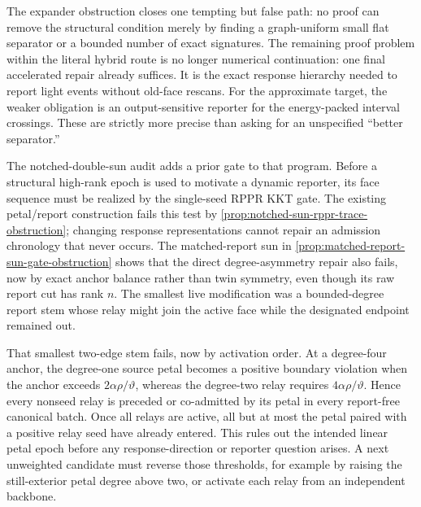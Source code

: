 The expander obstruction closes one tempting but false path: no proof can
remove the structural condition merely by finding a graph-uniform small flat
separator or a bounded number of exact signatures.  The remaining proof
problem within the literal hybrid route is no longer numerical continuation:
one final accelerated repair already suffices.  It is the exact response
hierarchy needed to report light events without old-face rescans.  For the
approximate target, the weaker obligation is an output-sensitive reporter for
the energy-packed interval crossings.  These are strictly more precise than
asking for an unspecified ``better separator.''

The notched-double-sun audit adds a prior gate to that program.  Before a
structural high-rank epoch is used to motivate a dynamic reporter, its face
sequence must be realized by the single-seed RPPR KKT gate.  The existing
petal/report construction fails this test by
\cref{prop:notched-sun-rppr-trace-obstruction}; changing response
representations cannot repair an admission chronology that never occurs.
The matched-report sun in
\cref{prop:matched-report-sun-gate-obstruction} shows that the direct
degree-asymmetry repair also fails, now by exact anchor balance rather than
twin symmetry, even though its raw report cut has rank $n$.  The smallest live
modification was a bounded-degree report stem whose relay might join the
active face while the designated endpoint remained out.

That smallest two-edge stem fails, now by activation order.  At a
degree-four anchor, the degree-one source petal becomes a positive boundary
violation when the anchor exceeds $2\alpha\rho/\vartheta$, whereas the
degree-two relay requires $4\alpha\rho/\vartheta$.  Hence every nonseed relay
is preceded or co-admitted by its petal in every report-free canonical batch.
Once all relays are active, all but at most the petal paired with a positive
relay seed have already entered.  This rules out the intended linear petal
epoch before any response-direction or reporter question arises.  A next
unweighted candidate must reverse those thresholds, for example by raising
the still-exterior petal degree above two, or activate each relay from an
independent backbone.

